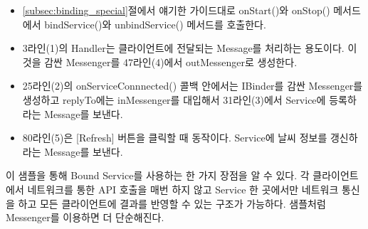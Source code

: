 \begin{itemize}
\item \ref{subsec:binding_special}절에서 얘기한 가이드대로 onStart()와 onStop() 메서드에서 bindService()와 unbindService() 메서드를 호출한다.
\item 3라인(1)의 Handler는 클라이언트에 전달되는 Message를 처리하는 용도이다. 이것을 감싼 Messenger를 47라인(4)에서 outMessenger로 생성한다.
\item 25라인(2)의 onServiceConnnected() 콜백 안에서는 IBinder를 감싼 Messenger를 생성하고 replyTo에는 inMessenger를 대입해서 31라인(3)에서 Service에 등록하라는 Message를  보낸다.
\item 80라인(5)은 [Refresh] 버튼을 클릭할 때 동작이다. Service에 날씨 정보를 갱신하라는 Message를 보낸다.
\end{itemize}

이 샘플을 통해 Bound Service를 사용하는 한 가지 장점을 알 수 있다. 각 클라이언트에서 네트워크를 통한 API 호출을 매번 하지 않고 Service 한 곳에서만 네트워크 통신을 하고 모든 클라이언트에 결과를 반영할 수 있는 구조가 가능하다. 샘플처럼  Messenger를 이용하면 더 단순해진다.
